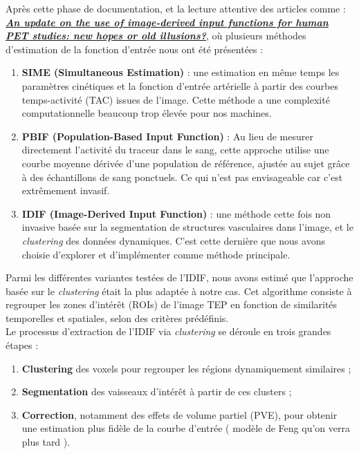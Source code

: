 \documentclass{article}
\begin{document}
            \noindent
            Après cette phase de documentation, et la lecture attentive des articles comme : \textbf{\textit{\href{https://pubmed.ncbi.nlm.nih.gov/37947880/}{An update on the use of image-derived input functions for human PET studies: new hopes or old illusions?}}}, où plusieurs méthodes d’estimation de la fonction d’entrée nous ont été présentées :

            \begin{enumerate}
                \item \textbf{SIME (Simultaneous Estimation)} : une estimation en même temps les paramètres cinétiques et la fonction d'entrée artérielle à partir des courbes temps-activité (TAC) issues de l'image. Cette méthode a une complexité computationnelle beaucoup trop élevée pour nos machines.
                \item \textbf{PBIF (Population-Based Input Function)} : Au lieu de mesurer directement l'activité du traceur dans le sang, cette approche utilise une courbe moyenne dérivée d'une population de référence, ajustée au sujet grâce à des échantillons de sang ponctuels. Ce qui n'est pas envisageable car c'est extrêmement invasif.
                \item \textbf{IDIF (Image-Derived Input Function)} : une méthode cette fois non invasive basée sur la segmentation de structures vasculaires dans l’image, et le \textit{clustering} des données dynamiques. C’est cette dernière que nous avons choisie d’explorer et d’implémenter comme méthode principale.
            \end{enumerate}
            
            Parmi les différentes variantes testées de l’IDIF, nous avons estimé que l’approche basée sur le \textit{clustering} était la plus adaptée à notre cas. Cet algorithme consiste à regrouper les zones d’intérêt (ROIs) de l’image TEP en fonction de similarités temporelles et spatiales, selon des critères prédéfinis.\\
            
            Le processus d'extraction de l'IDIF via \textit{clustering} se déroule en trois grandes étapes :
            
            \begin{enumerate}
                \item \textbf{Clustering} des voxels pour regrouper les régions dynamiquement similaires ;
                \item \textbf{Segmentation} des vaisseaux d’intérêt à partir de ces clusters ;
                \item \textbf{Correction}, notamment des effets de volume partiel (PVE), pour obtenir une estimation plus fidèle de la courbe d’entrée ( modèle de Feng qu'on verra plus tard ).
            \end{enumerate}
            
\end{document}
